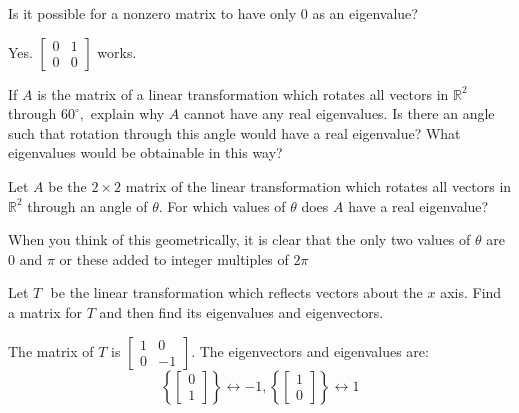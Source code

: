 \documentclass{ximera}
\begin{document}
\begin{problem}\label{prb:8.14} Is it possible for a nonzero matrix to have only $0$ as an eigenvalue?

\begin{hint}
Yes. $\left[
\begin{array}{cc}
0 & 1 \\
0 & 0%
\end{array}
\right] $ works.
\end{hint}
\end{problem}

\begin{problem}\label{prb:8.15} If $A$ is the matrix of a linear transformation which rotates all
vectors in $\mathbb{R}^{2}$ through $60^{\circ },$ explain why $A$ cannot
have any real eigenvalues. Is there an angle such that rotation through this
angle would have a real eigenvalue? What eigenvalues would be obtainable in
this way? \vspace{1mm}
\end{problem}


\begin{problem}\label{prb:8.16} Let $A$ be the $2\times 2$ matrix of the linear transformation which
rotates all vectors in $\mathbb{R}^{2}$ through an angle of $\theta $. For
which values of $\theta $ does $A$ have a real eigenvalue?
\begin{hint}
When you think of this geometrically, it is clear that the only two values
of $\theta $ are 0 and $\pi $ or these added to integer multiples of $2\pi $
\end{hint}
\end{problem}


\begin{problem}\label{prb:8.17} Let $T\,$\ be the linear transformation which reflects vectors about
the $x$ axis. Find a matrix for $T$ and then find its eigenvalues and
eigenvectors.
\begin{hint}
The matrix of $T$ is $\left[
\begin{array}{rr}
1 & 0 \\
0 & -1
\end{array}
\right]$. The eigenvectors and eigenvalues are:
\[
\left\{ \left[
\begin{array}{c}
0 \\
1
\end{array}
\right] \right\} \leftrightarrow -1,\left\{ \left[
\begin{array}{c}
1 \\
0
\end{array}
\right] \right\} \leftrightarrow 1
\]
\end{hint}
\end{problem}
\end{document}
